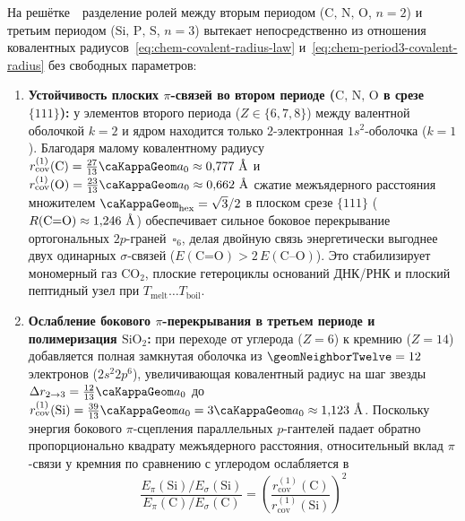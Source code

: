 \begin{theorem}
\label{thm:chem-chnops-selection}
На решётке~\latGCKshort\ разделение ролей между вторым периодом ($\text{C, N, O}$, $n=2$) и третьим периодом ($\text{Si, P, S}$, $n=3$) вытекает непосредственно из отношения ковалентных радиусов~\eqref{eq:chem-covalent-radius-law} и~\eqref{eq:chem-period3-covalent-radius} без свободных параметров:
\begin{enumerate}[leftmargin=*,noitemsep]
\item \textbf{Устойчивость плоских $\pi$-связей во втором периоде ($\text{C, N, O}$ в срезе $\{111\}$):}
  у элементов второго периода ($Z\in\{6,7,8\}$) между валентной оболочкой $k=2$ и ядром находится только $2$-электронная $1s^2$-оболочка ($k=1$). Благодаря малому ковалентному радиусу $r_{\mathrm{cov}}^{(1)}(\text{C}) = \frac{27}{13}\caKappaGeom a_0 \approx 0{,}777\ \text{\normalfont\AA}$ и $r_{\mathrm{cov}}^{(1)}(\text{O}) = \frac{23}{13}\caKappaGeom a_0 \approx 0{,}662\ \text{\normalfont\AA}$ сжатие межъядерного расстояния множителем $\caKappaGeom_{\mathrm{hex}} = \sqrt{3}/2$ в плоском срезе $\{111\}$ ($R(\text{C=O}) \approx 1{,}246\ \text{\normalfont\AA}$) обеспечивает сильное боковое перекрывание ортогональных $2p$-граней~$\square_6$, делая двойную связь энергетически выгоднее двух одинарных $\sigma$-связей ($E(\text{C=O}) > 2\,E(\text{C--O})$). Это стабилизирует мономерный газ $\text{CO}_2$, плоские гетероциклы оснований ДНК/РНК и плоский пептидный узел при $T_{\mathrm{melt}}\ldots T_{\mathrm{boil}}$.
\item \textbf{Ослабление бокового $\pi$-перекрывания в третьем периоде и полимеризация $\text{SiO}_2$:}
  при переходе от углерода ($Z=6$) к кремнию ($Z=14$) добавляется полная замкнутая оболочка из $\geomNeighborTwelve = 12$ электронов ($2s^2 2p^6$), увеличивающая ковалентный радиус на шаг звезды $\Delta r_{2\to 3} = \frac{12}{13}\caKappaGeom a_0$ до $r_{\mathrm{cov}}^{(1)}(\text{Si}) = \frac{39}{13}\caKappaGeom a_0 = 3\caKappaGeom a_0 \approx 1{,}123\ \text{\normalfont\AA}$. Поскольку энергия бокового $\pi$-сцепления параллельных $p$-гантелей падает обратно пропорционально квадрату межъядерного расстояния, относительный вклад $\pi$-связи у кремния по сравнению с углеродом ослабляется в
  \begin{equation}
  \label{eq:chem-pi-suppression-si}
    \frac{E_\pi(\text{Si}) / E_\sigma(\text{Si})}{E_\pi(\text{C}) / E_\sigma(\text{C})}
    = \left(\frac{r_{\mathrm{cov}}^{(1)}(\text{C})}{r_{\mathrm{cov}}^{(1)}(\text{Si})}\right)^{\!2}

\end{equation}
\end{enumerate}
\end{theorem}
